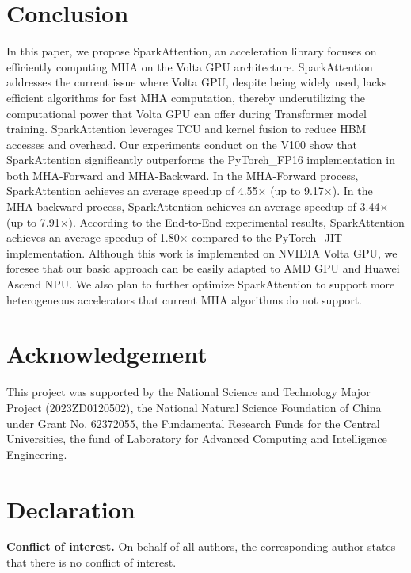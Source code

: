 \documentclass[10pt,twocolumn]{article}
\begin{document}
\section{Conclusion}\label{sec7}

In this paper, we propose SparkAttention, an acceleration library focuses on efficiently computing MHA on the Volta GPU architecture. 
SparkAttention addresses the current issue where Volta GPU, despite being widely used, lacks efficient algorithms for fast MHA computation, thereby underutilizing the computational power that Volta GPU can offer during Transformer model training.
SparkAttention leverages TCU and kernel fusion to reduce HBM accesses and overhead.
Our experiments conduct on the V100 show that SparkAttention significantly outperforms the PyTorch\_FP16 implementation in both MHA-Forward and MHA-Backward. 
In the MHA-Forward process, SparkAttention achieves an average speedup of 4.55$\times$ (up to 9.17$\times$). 
In the MHA-backward process, SparkAttention achieves an average speedup of 3.44$\times$ (up to 7.91$\times$). 
According to the End-to-End experimental results, SparkAttention achieves an average speedup of 1.80$\times$ compared to the PyTorch\_JIT implementation. 
Although this work is implemented on NVIDIA Volta GPU, we foresee that our basic approach can be easily adapted to AMD GPU and Huawei Ascend NPU. 
We also plan to further optimize SparkAttention to support more heterogeneous accelerators that current MHA algorithms do not support.

\section{Acknowledgement}
This project was supported by the National Science and Technology Major Project (2023ZD0120502), the National Natural Science Foundation of China under Grant No. 62372055, the Fundamental Research Funds for the Central Universities, the fund of Laboratory for Advanced Computing and Intelligence Engineering.

\section{Declaration}
\textbf{Conflict of interest. }On behalf of all authors, the corresponding author states that there is no conflict of interest.



\end{document}
